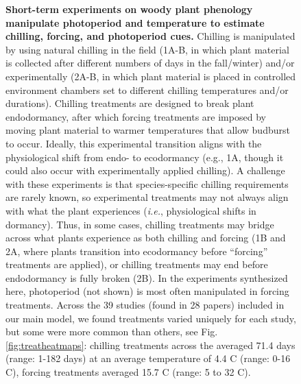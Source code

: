 \documentclass{article}
\begin{document}
\begin{figure}[hp!]
\caption{\textbf{Short-term experiments on woody plant phenology manipulate photoperiod and temperature to estimate chilling, forcing, and photoperiod cues.} Chilling is manipulated by using natural chilling in the field (1A-B, in which plant material is collected after different numbers of days in the fall/winter) and/or experimentally (2A-B, in which plant material is placed in controlled environment chambers set to different chilling temperatures and/or durations). Chilling treatments are designed to break plant endodormancy, after which forcing treatments are imposed by moving plant material to warmer temperatures that allow budburst to occur. Ideally, this experimental transition aligns with the physiological shift from endo- to ecodormancy (e.g., 1A, though it could also occur with experimentally applied chilling). A challenge with these experiments is that species-specific chilling requirements are rarely known, so experimental treatments may not always align with what the plant experiences (\emph{i.e.}, physiological shifts in dormancy). Thus, in some cases, chilling treatments may bridge across what plants experience as both chilling and forcing (1B and 2A, where plants transition into ecodormancy before ``forcing'' treatments are applied), or chilling treatments may end before endodormancy is fully broken (2B). In the experiments synthesized here, photoperiod (not shown) is most often manipulated in forcing treatments. Across the 39 studies (found in 28 papers) included in our main model, we found treatments varied uniquely for each study, but some were more common than others, see Fig. \ref{fig:treatheatmaps}: chilling treatments across the averaged 71.4 days (range: 1-182 days) at an average temperature of 4.4 \degree C (range: 0-16 \degree C), forcing treatments averaged 15.7 \degree C (range: 5 to 32 \degree C).}
\label{fig:concept} 
\end{figure}
\end{document}
